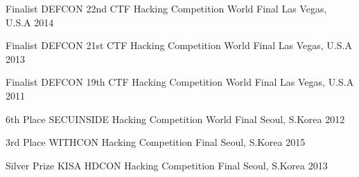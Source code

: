 



\begin{cvhonors}

  \cvhonor
    {Finalist} %
    {DEFCON 22nd CTF Hacking Competition World Final} %
    {Las Vegas, U.S.A} %
    {2014} %

  \cvhonor
    {Finalist} %
    {DEFCON 21st CTF Hacking Competition World Final} %
    {Las Vegas, U.S.A} %
    {2013} %

  \cvhonor
    {Finalist} %
    {DEFCON 19th CTF Hacking Competition World Final} %
    {Las Vegas, U.S.A} %
    {2011} %

  \cvhonor
    {6th Place} %
    {SECUINSIDE Hacking Competition World Final} %
    {Seoul, S.Korea} %
    {2012} %

\end{cvhonors}




\begin{cvhonors}

  \cvhonor
    {3rd Place} %
    {WITHCON Hacking Competition Final} %
    {Seoul, S.Korea} %
    {2015} %

  \cvhonor
    {Silver Prize} %
    {KISA HDCON Hacking Competition Final} %
    {Seoul, S.Korea} %
    {2013} %

\end{cvhonors}
